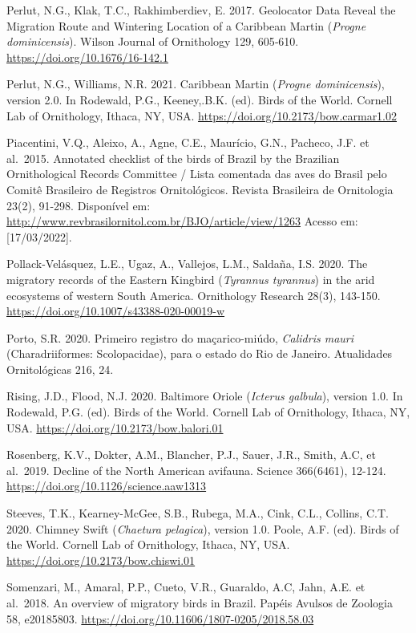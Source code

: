 \documentclass[
  oneside]{scrbook}
\begin{document}
Perlut, N.G., Klak, T.C., Rakhimberdiev, E. 2017. Geolocator Data Reveal the Migration Route and Wintering Location of a Caribbean Martin (\emph{Progne dominicensis}). Wilson Journal of Ornithology 129, 605‑610. \url{https://doi.org/10.1676/16-142.1}

Perlut, N.G., Williams, N.R. 2021. Caribbean Martin (\emph{Progne dominicensis}), version 2.0. In Rodewald, P.G., Keeney,.B.K. (ed). Birds of the World. Cornell Lab of Ornithology, Ithaca, NY, USA. \url{https://doi.org/10.2173/bow.carmar1.02}

Piacentini, V.Q., Aleixo, A., Agne, C.E., Maurício, G.N., Pacheco, J.F. et al.~2015. Annotated checklist of the birds of Brazil by the Brazilian Ornithological Records Committee / Lista comentada das aves do Brasil pelo Comitê Brasileiro de Registros Ornitológicos. Revista Brasileira de Ornitologia 23(2), 91-298. Disponível em: \url{http://www.revbrasilornitol.com.br/BJO/article/view/1263} Acesso em: {[}17/03/2022{]}.

Pollack-Velásquez, L.E., Ugaz, A., Vallejos, L.M., Saldaña, I.S. 2020. The migratory records of the Eastern Kingbird (\emph{Tyrannus tyrannus}) in the arid ecosystems of western South America. Ornithology Research 28(3), 143-150. \url{https://doi.org/10.1007/s43388-020-00019-w}

Porto, S.R. 2020. Primeiro registro do maçarico-miúdo, \emph{Calidris mauri} (Charadriiformes: Scolopacidae), para o estado do Rio de Janeiro. Atualidades Ornitológicas 216, 24.

Rising, J.D., Flood, N.J. 2020. Baltimore Oriole (\emph{Icterus galbula}), version 1.0. In Rodewald, P.G. (ed). Birds of the World. Cornell Lab of Ornithology, Ithaca, NY, USA. \url{https://doi.org/10.2173/bow.balori.01}

Rosenberg, K.V., Dokter, A.M., Blancher, P.J., Sauer, J.R., Smith, A.C, et al.~2019. Decline of the North American avifauna. Science 366(6461), 12-124. \url{https://doi.org/10.1126/science.aaw1313}

Steeves, T.K., Kearney-McGee, S.B., Rubega, M.A., Cink, C.L., Collins, C.T. 2020. Chimney Swift (\emph{Chaetura pelagica}), version 1.0. Poole, A.F. (ed). Birds of the World. Cornell Lab of Ornithology, Ithaca, NY, USA. \url{https://doi.org/10.2173/bow.chiswi.01}

Somenzari, M., Amaral, P.P., Cueto, V.R., Guaraldo, A.C, Jahn, A.E. et al.~2018. An overview of migratory birds in Brazil. Papéis Avulsos de Zoologia 58, e20185803. \url{https://doi.org/10.11606/1807-0205/2018.58.03}
\end{document}
